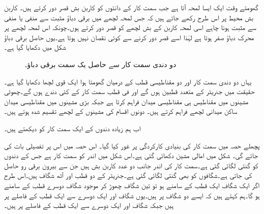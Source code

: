 گھومتے وقت ایک ایسا لمحہ آتا ہے جب سمت کار کے  دانتوں کو کاربن بش  قصر دور کرتے ہیں۔ کاربن بش  محیط پر اس طرح رکھے جاتے ہیں کہ جس لمحہ لچھے میں برقی دباؤ مثبت سے منفی یا منفی سے مثبت ہونا چاہے اسی لمحہ کاربن کے بش لچھے کو قصر دور کرتے ہوں۔چونکہ اس لمحہ  لچھے پر محرک  دباؤ صفر ہوتا ہے لہٰذا اسے قصر دور کرنے سے کوئی نقصان نہیں ہوتا ہے۔یوں حاصل برقی دباؤ شکل   میں دکھایا گیا ہے۔
\begin{figure}
\centering
\caption{دو دندی سمت کار سے حاصل یک سمت  برقی دباؤ۔}
\label{شکل_یکسمتی_دو_دندوں_کا_سمتکار}
\end{figure}


یہاں دو دندی سمت کار اور دو مقناطیسی قطب کے درمیان گھومتا ہوا ایک قوی لچھا دکھایا گیا ہے۔حقیقت میں جنریٹر کے متعدد قطبین ہوں گے اور فی قطب  سمت کار کے کئی دندے ہوں گے۔چھوٹی مشینوں میں مقناطیس ہی مقناطیسی میدان  فراہم کرتا ہے جبکہ بڑی مشینوں میں مقناطیسی میدان ساکن میدانی لچھے فراہم کرتے ہیں۔ دونوں اقسام کی مشینوں  کے لچھے تقسیم شدہ ہوتے ہیں۔

اب ہم زیادہ دندوں کے ایک سمت کار کو دیکھتے ہیں۔

پچھلے حصہ میں سمت کار کی بنیادی کارکردگی پر غور کیا گیا۔ اس حصہ میں اس پر تفصیلی بات کی جائے گی۔ شکل  میں امالی مشین دکھائی گئی ہے۔اس شکل میں اندر کو سمت کار ہے جس کے دندوں کو گنتی لگائی گئی ہے۔سمت کار کی اندر جانب دو عدد  کاربن بش ہیں جن سے   بیرون  برقی رو  حاصل کی جاتی ہے۔شگافوں کو بھی گنتی لگائی گئی  ہے۔جنریٹر کے دو قطب اور آٹھ شگاف ہیں۔اس طرح اگر ایک شگاف ایک قطب کے سامنے ہو تو تین شگاف چھوڑ کر موجود شگاف دوسرے قطب کے سامنے ہو گا۔ہم کہتے ہیں کہ ایسے دو شگاف   پر ہیں۔یوں شگاف  اور  ایک دوسرے سے ایک قطب کے فاصلے پر ہیں جبکہ    شگاف  اور  ایک دوسرے سے ایک قطب کے فاصلے پر ہیں۔

